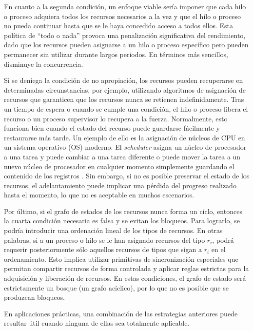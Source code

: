 En cuanto a la segunda condición, un enfoque viable sería imponer que cada hilo o proceso
adquiera todos los recursos necesarios a la vez y que el hilo o proceso no pueda continuar hasta
que se le haya concedido acceso a todos ellos. Esta política de ``todo o nada'' provoca una
penalización significativa del rendimiento, dado que los recursos pueden asignarse a un hilo o
proceso específico pero pueden permanecer sin utilizar durante largos periodos. En términos
más sencillos, disminuye la concurrencia.

Si se deniega la condición de no apropiación, los recursos pueden recuperarse en determinadas
circunstancias, por ejemplo, utilizando algoritmos de asignación de recursos que garanticen que
los recursos nunca se retienen indefinidamente. Tras un tiempo de espera o cuando se cumple
una condición, el hilo o proceso libera el recurso o un proceso supervisor lo recupera a la
fuerza. Normalmente, esto funciona bien cuando el estado del recurso puede guardarse
fácilmente y restaurarse más tarde. Un ejemplo de ello es la asignación de núcleos de CPU en
un sistema operativo (\acrshort{OS}) moderno.
El \textit{scheduler} asigna un núcleo de procesador a una
tarea y puede cambiar a una tarea diferente o puede mover la tarea a un nuevo núcleo de
procesador en cualquier momento simplemente guardando el contenido de los registros
\cite[Chap. 6]{ArpaciDusseau2018}. Sin embargo, si no es posible preservar el
estado de los recursos, el adelantamiento puede implicar una pérdida del progreso realizado
hasta el momento, lo que no es aceptable en muchos escenarios.

Por último, si el grafo de estados de los recursos nunca forma un ciclo, entonces la cuarta
condición necesaria es falsa y se evitan los bloqueos. Para lograrlo, se podría introducir una
ordenación lineal de los tipos de recursos. En otras palabras, si a un proceso o hilo se le han
asignado recursos del tipo $r_i$, podrá requerir posteriormente sólo aquellos recursos de tipos que
sigan a $r_i$ en el ordenamiento. Esto implica utilizar primitivas de sincronización especiales que
permitan compartir recursos de forma controlada y aplicar reglas estrictas para la adquisición y
liberación de recursos. En estas condiciones, el grafo de estado será estrictamente un bosque
(un grafo acíclico), por lo que no es posible que se produzcan bloqueos.

En aplicaciones prácticas, una combinación de las estrategias anteriores puede resultar útil
cuando ninguna de ellas sea totalmente aplicable.

